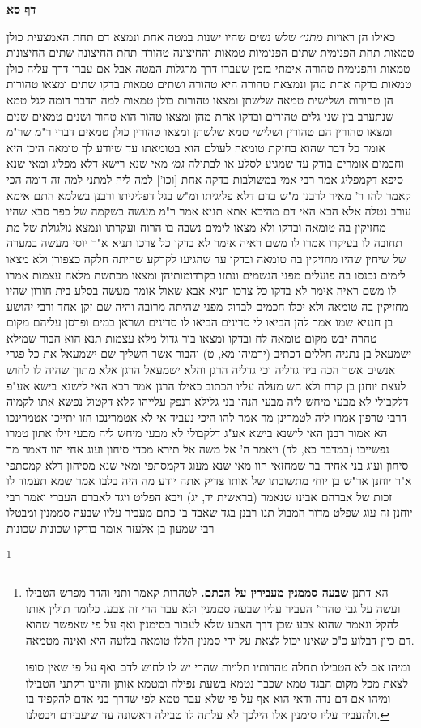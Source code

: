 \documentclass[12pt, openany]{book}
\newcommand{\sethebfont}{
\fontsize{10.5pt}{21.0pt} \selectfont
}
\newcommand{\twocol}[1]{
	{\sethebfont \begin{multicols}{2}
			#1
	\end{multicols}}	
}
\newcommand{\sectname}{}
\newcommand{\newsection}[1]{
	\addcontentsline{toc}{section}{#1}
	\renewcommand{\sectname}{#1}	
	\vspace{-\baselineskip}
	\begin{center}
		\textbf{%
\fontsize{16pt}{16pt}\selectfont
			#1}
	\end{center}
	\vspace{-\baselineskip}
	\nopagebreak
}
\newcommand{\footnotecomment}[1]{
	\renewcommand\thefootnote{}
	\footnote{#1}}
\newcommand{\commenta}[1]{\footnotecomment{#1}}
\begin{document}
\newsection{דף סא}
\twocol{כאילו הן ראויות
{\large\emph{מתני׳}} שלש נשים שהיו ישנות במטה אחת ונמצא דם תחת האמצעית כולן טמאות תחת הפנימית שתים הפנימיות טמאות והחיצונה טהורה תחת החיצונה שתים החיצונות טמאות והפנימית טהורה 
אימתי בזמן שעברו דרך מרגלות המטה אבל אם עברו דרך עליה כולן טמאות בדקה אחת מהן ונמצאת טהורה היא טהורה ושתים טמאות בדקו שתים ומצאו טהורות הן טהורות ושלישית טמאה שלשתן ומצאו טהורות כולן טמאות 
למה הדבר דומה לגל טמא שנתערב בין שני גלים טהורים ובדקו אחת מהן ומצאו טהור הוא טהור ושנים טמאים שנים ומצאו טהורין הם טהורין ושלישי טמא 
שלשתן ומצאו טהורין כולן טמאים דברי ר"מ שר"מ אומר כל דבר שהוא בחזקת טומאה לעולם הוא בטומאתו עד שיודע לך טומאה היכן היא 
וחכמים אומרים בודק עד שמגיע לסלע או לבתולה
{\large\emph{גמ׳}} מאי שנא רישא דלא מפליג ומאי שנא סיפא דקמפליג אמר רבי אמי במשולבות
בדקה אחת [וכו'] למה ליה למתני למה זה דומה 
הכי קאמר להו ר' מאיר לרבנן מ"ש בדם דלא פליגיתו ומ"ש בגל דפליגיתו 
ורבנן בשלמא התם אימא עורב נטלה אלא הכא האי דם מהיכא אתא 
תניא אמר ר"מ מעשה בשקמה של כפר סבא שהיו מחזיקין בה טומאה ובדקו ולא מצאו לימים נשבה בו הרוח ועקרתו ונמצא גולגולת של מת תחובה לו בעיקרו אמרו לו משם ראיה אימר לא בדקו כל צרכו 
תניא א"ר יוסי מעשה במערה של שיחין שהיו מחזיקין בה טומאה ובדקו עד שהגיעו לקרקע שהיתה חלקה כצפורן ולא מצאו לימים נכנסו בה פועלים מפני הגשמים ונתזו בקרדומותיהן ומצאו מכתשת מלאה עצמות אמרו לו משם ראיה אימר לא בדקו כל צרכו 
תניא אבא שאול אומר מעשה בסלע בית חורון שהיו מחזיקין בה טומאה ולא יכלו חכמים לבדוק מפני שהיתה מרובה והיה שם זקן אחד ורבי יהושע בן חנניא שמו אמר להן הביאו לי סדינים הביאו לו סדינים ושראן במים ופרסן עליהם מקום טהרה יבש מקום טומאה לח ובדקו ומצאו בור גדול מלא עצמות 
תנא הוא הבור שמילא ישמעאל בן נתניה חללים דכתיב (ירמיהו מא, ט) והבור אשר השליך שם ישמעאל את כל פגרי אנשים אשר הכה ביד גדליה 
וכי גדליה הרגן והלא ישמעאל הרגן אלא מתוך שהיה לו לחוש לעצת יוחנן בן קרח ולא חש מעלה עליו הכתוב כאילו הרגן 
אמר רבא האי לישנא בישא אע"פ דלקבולי לא מבעי מיחש ליה מבעי 
הנהו בני גלילא דנפק עלייהו קלא דקטול נפשא אתו לקמיה דרבי טרפון אמרו ליה לטמרינן מר אמר להו היכי נעביד אי לא אטמרינכו חזו יתייכו אטמרינכו הא אמור רבנן האי לישנא בישא אע"ג דלקבולי לא מבעי מיחש ליה מבעי זילו אתון טמרו נפשייכו 
(במדבר כא, לד) ויאמר ה' אל משה אל תירא מכדי סיחון ועוג אחי הוו דאמר מר סיחון ועוג בני אחיה בר שמחזאי הוו מאי שנא מעוג דקמסתפי ומאי שנא מסיחון דלא קמסתפי 
א"ר יוחנן אר"ש בן יוחי מתשובתו של אותו צדיק אתה יודע מה היה בלבו אמר שמא תעמוד לו זכות של אברהם אבינו
שנאמר (בראשית יד, יג) ויבא הפליט ויגד לאברם העברי ואמר רבי יוחנן זה עוג שפלט מדור המבול 
תנו רבנן בגד שאבד בו כתם מעביר עליו שבעה סממנין ומבטלו רבי שמעון בן אלעזר אומר
בודקו שכונות שכונות 
\commenta{הא דתנן \textbf{שבעה סממנין מעבירין על הכתם.} לטהרות קאמר ותני והדר מפרש הטבילו ועשה על גבי טהרו' העביר עליו שבעה סממנין ולא עבר הרי זה צבע. כלומר תולין אותו להקל ונאמר שהוא צבע שכן דרך הצבע שלא לעבור בסימנין ואף על פי שאפשר שהוא דם כיון דבלוע כ"כ שאינו יכול לצאת על ידי סמנין הללו טומאה בלועה היא ואינה מטמאה.\par ומיהו אם לא הטבילו תחלה טהרותיו תלויות שהרי יש לו לחוש לדם ואף על פי שאין סופו לצאת מכל מקום הבגד טמא שכבר נטמא בשעת נפילה ומטמא אותן והיינו דקתני הטבילו ומיהו אם דם נדה ודאי הוא אף על פי שלא עבר טמא לפי שדרך בני אדם להקפיד בו ולהעביר עליו סימנין אלו הילכך לא עלתה לו טבילה ראשונה עד שיעבירם ויבטלנו. }
}
\end{document}
